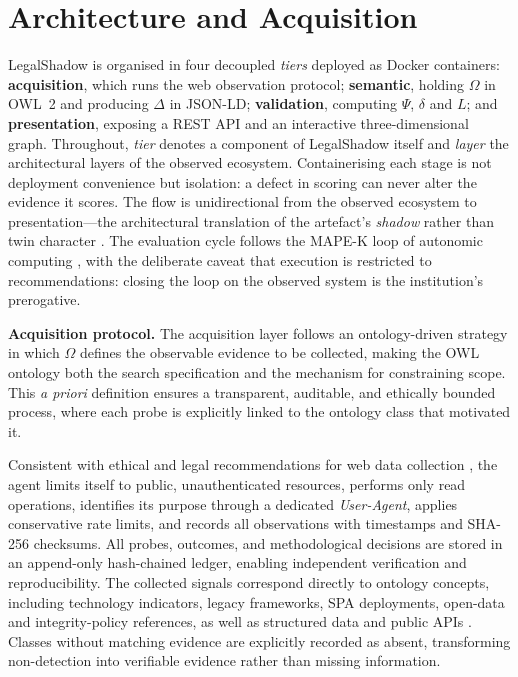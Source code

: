 \documentclass[engproc,proceedingpaper,submit,moreauthors]{Definitions/mdpi}
\begin{document}
\section{Architecture and Acquisition}
\label{sec:arch}
    LegalShadow is organised in four decoupled \emph{tiers} deployed as Docker containers: \textbf{acquisition}, which runs the web observation protocol; \textbf{semantic}, holding $\Omega$ in OWL~2 and producing $\Delta$ in JSON-LD; \textbf{validation}, computing $\Psi$, $\delta$ and $L$; and \textbf{presentation}, exposing a REST API and an interactive three-dimensional graph. Throughout, \emph{tier} denotes a component of LegalShadow itself and \emph{layer} the architectural layers of the observed ecosystem. Containerising each stage is not deployment convenience but isolation: a defect in scoring can never alter the evidence it scores. The flow is unidirectional from the observed ecosystem to presentation---the architectural translation of the artefact's \emph{shadow} rather than twin character \cite{Kritzinger2018,Sepasgozar2021}. The evaluation cycle follows the MAPE-K loop of autonomic computing \cite{Kephart2003}, with the deliberate caveat that execution is restricted to recommendations: closing the loop on the observed system is the institution's prerogative.

\textbf{Acquisition protocol.} 
    The acquisition layer follows an ontology-driven strategy in which $\Omega$ defines the observable evidence to be collected, making the OWL ontology both the search specification and the mechanism for constraining scope. This \emph{a priori} definition ensures a transparent, auditable, and ethically bounded process, where each probe is explicitly linked to the ontology class that motivated it.

    Consistent with ethical and legal recommendations for web data collection \cite{Krotov2020}, the agent limits itself to public, unauthenticated resources, performs only read operations, identifies its purpose through a dedicated \emph{User-Agent}, applies conservative rate limits, and records all observations with timestamps and SHA-256 checksums. All probes, outcomes, and methodological decisions are stored in an append-only hash-chained ledger, enabling independent verification and reproducibility. The collected signals correspond directly to ontology concepts, including technology indicators, legacy frameworks, SPA deployments, open-data and integrity-policy references, as well as structured data and public APIs \cite{Guha2016}. Classes without matching evidence are explicitly recorded as absent, transforming non-detection into verifiable evidence rather than missing information.
\end{document}
